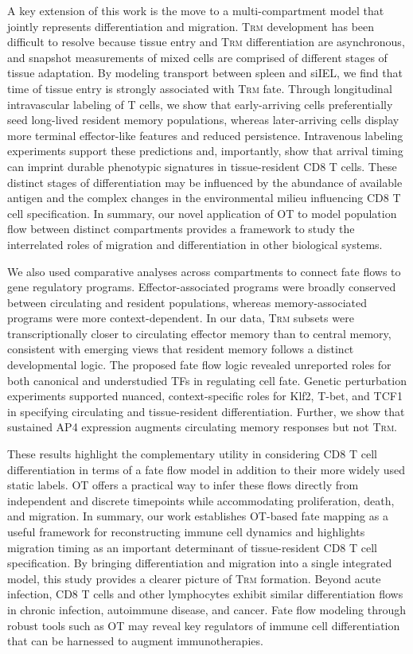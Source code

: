 A key extension of this work is the move to a multi-compartment model that jointly represents differentiation and migration. T\textsc{rm} development has been difficult to resolve because tissue entry and T\textsc{rm} differentiation are asynchronous, and snapshot measurements of mixed cells are comprised of different stages of tissue adaptation. By modeling transport between spleen and siIEL, we find that time of tissue entry is strongly associated with T\textsc{rm} fate. Through longitudinal intravascular labeling of T cells, we show that early-arriving cells preferentially seed long-lived resident memory populations, whereas later-arriving cells display more terminal effector-like features and reduced persistence. Intravenous labeling experiments support these predictions and, importantly, show that arrival timing can imprint durable phenotypic signatures in tissue-resident CD8 T cells. These distinct stages of differentiation may be influenced by the abundance of available antigen and the complex changes in the environmental milieu influencing CD8 T cell specification. In summary, our novel application of OT to model population flow between distinct compartments provides a framework to study the interrelated roles of migration and differentiation in other biological systems.

We also used comparative analyses across compartments to connect fate flows to gene regulatory programs. Effector-associated programs were broadly conserved between circulating and resident populations, whereas memory-associated programs were more context-dependent. In our data, T\textsc{rm} subsets were transcriptionally closer to circulating effector memory than to central memory, consistent with emerging views that resident memory follows a distinct developmental logic. The proposed fate flow logic revealed unreported roles for both canonical and understudied TFs in regulating cell fate. Genetic perturbation experiments supported nuanced, context-specific roles for Klf2, T-bet, and TCF1 in specifying circulating and tissue-resident differentiation. Further, we show that sustained AP4 expression augments circulating memory responses but not T\textsc{rm}.

These results highlight the complementary utility in considering CD8 T cell differentiation in terms of a fate flow model in addition to their more widely used static labels. OT offers a practical way to infer these flows directly from independent and discrete timepoints while accommodating proliferation, death, and migration. In summary, our work establishes OT-based fate mapping as a useful framework for reconstructing immune cell dynamics and highlights migration timing as an important determinant of tissue-resident CD8 T cell specification. By bringing differentiation and migration into a single integrated model, this study provides a clearer picture of T\textsc{rm} formation. Beyond acute infection, CD8 T cells and other lymphocytes exhibit similar differentiation flows in chronic infection, autoimmune disease, and cancer. Fate flow modeling through robust tools such as OT may reveal key regulators of immune cell differentiation that can be harnessed to augment immunotherapies.

